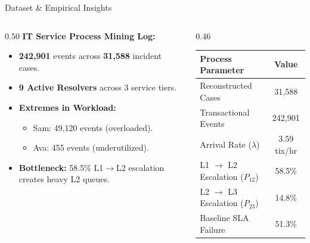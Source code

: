 \documentclass[10pt,aspectratio=169]{beamer}
\begin{document}
\begin{frame}{Dataset \& Empirical Insights}
    \begin{columns}[c]
        \begin{column}{0.50\textwidth}
            \textbf{IT Service Process Mining Log:}
            \vspace{0.2cm}
            \begin{itemize}
                \setlength\itemsep{0.6em}
                \item \textbf{242,901} events across \textbf{31,588} incident cases.
                \item \textbf{9 Active Resolvers} across 3 service tiers.
                \item \textbf{Extremes in Workload:}
                \begin{itemize}
                    \item Sam: 49,120 events (overloaded).
                    \item Ava: 455 events (underutilized).
                \end{itemize}
                \item \textbf{Bottleneck:} 58.5\% L1$\to$L2 escalation creates heavy L2 queues.
            \end{itemize}
        \end{column}
        \begin{column}{0.46\textwidth}
            \centering
            \small
            \begin{tabular}{lc}
                \toprule
                \textbf{Process Parameter} & \textbf{Value} \\
                \midrule
                Reconstructed Cases & 31,588 \\
                Transactional Events & 242,901 \\
                Arrival Rate ($\lambda$) & 3.59 tix/hr \\
                L1 $\to$ L2 Escalation ($P_{12}$) & 58.5\% \\
                L2 $\to$ L3 Escalation ($P_{23}$) & 14.8\% \\
                Baseline SLA Failure & 51.3\% \\
                \bottomrule
            \end{tabular}
        \end{column}
    \end{columns}
\end{frame}
\end{document}
